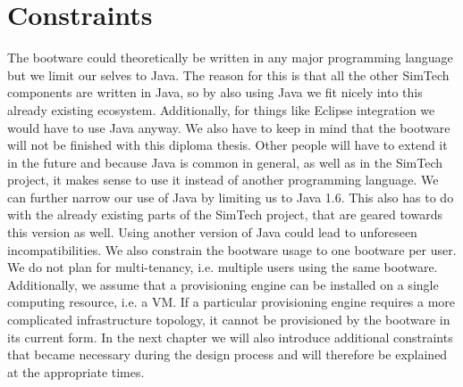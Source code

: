 \section{Constraints}

The bootware could theoretically be written in any major programming language but we limit our selves to Java.
The reason for this is that all the other SimTech components are written in Java, so by also using Java we fit nicely into this already existing ecosystem.
Additionally, for things like Eclipse integration we would have to use Java anyway.
We also have to keep in mind that the bootware will not be finished with this diploma thesis.
Other people will have to extend it in the future and because Java is common in general, as well as in the SimTech project, it makes sense to use it instead of another programming language.
We can further narrow our use of Java by limiting us to Java 1.6.
This also has to do with the already existing parts of the SimTech project, that are geared towards this version as well.
Using another version of Java could lead to unforeseen incompatibilities.
We also constrain the bootware usage to one bootware per user.
We do not plan for multi-tenancy, i.e. multiple users using the same bootware.
Additionally, we assume that a provisioning engine can be installed on a single computing resource, i.e. a VM.
If a particular provisioning engine requires a more complicated infrastructure topology, it cannot be provisioned by the bootware in its current form.
In the next chapter we will also introduce additional constraints that became necessary during the design process and will therefore be explained at the appropriate times.
